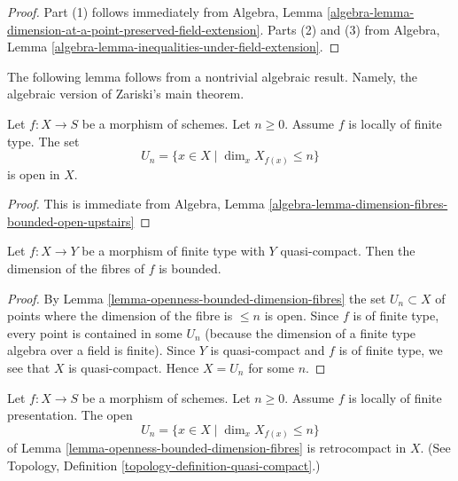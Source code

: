 \begin{proof}
Part (1) follows immediately from
Algebra,
Lemma \ref{algebra-lemma-dimension-at-a-point-preserved-field-extension}.
Parts (2) and (3) from
Algebra, Lemma \ref{algebra-lemma-inequalities-under-field-extension}.
\end{proof}

\noindent
The following lemma follows from a nontrivial algebraic result.
Namely, the algebraic version of Zariski's main theorem.

\begin{lemma}
\label{lemma-openness-bounded-dimension-fibres}
\begin{reference}
\cite[IV Theorem 13.1.3]{EGA}
\end{reference}
Let $f : X \to S$ be a morphism of schemes.
Let $n \geq 0$. Assume $f$ is locally of finite type.
The set
$$
U_n = \{x \in X \mid \dim_x X_{f(x)} \leq n\}
$$
is open in $X$.
\end{lemma}

\begin{proof}
This is immediate from
Algebra,
Lemma \ref{algebra-lemma-dimension-fibres-bounded-open-upstairs}
\end{proof}

\begin{lemma}
\label{lemma-morphism-finite-type-bounded-dimension}
Let $f : X \to Y$ be a morphism of finite type with $Y$ quasi-compact.
Then the dimension of the fibres of $f$ is bounded.
\end{lemma}

\begin{proof}
By Lemma \ref{lemma-openness-bounded-dimension-fibres}
the set $U_n \subset X$ of points where the dimension of the fibre
is $\leq n$ is open. Since $f$ is of finite type, every point is
contained in some $U_n$ (because the dimension of a finite
type algebra over a field is finite). Since $Y$ is quasi-compact and $f$ is of
finite type, we see that $X$ is quasi-compact. Hence $X = U_n$ for
some $n$.
\end{proof}

\begin{lemma}
\label{lemma-openness-bounded-dimension-fibres-finite-presentation}
Let $f : X \to S$ be a morphism of schemes.
Let $n \geq 0$. Assume $f$ is locally of finite presentation.
The open
$$
U_n = \{x \in X \mid \dim_x X_{f(x)} \leq n\}
$$
of Lemma \ref{lemma-openness-bounded-dimension-fibres} is retrocompact
in $X$. (See Topology, Definition \ref{topology-definition-quasi-compact}.)
\end{lemma}

